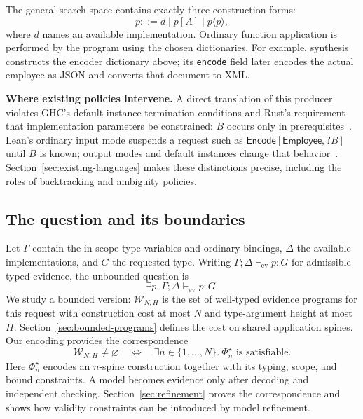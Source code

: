 \documentclass[10pt,a4paper]{article}
\newcommand{\iarg}[1]{\langle#1\rangle}
\newcommand{\kw}[1]{\mathsf{#1}}
\begin{document}
The general search space contains exactly three construction forms:
\[
 p::=d\mid p[A]\mid p\iarg{p},
\]
where $d$ names an available implementation. Ordinary function application is
performed by the program using the chosen dictionaries. For example, synthesis
constructs the encoder dictionary above; its \texttt{encode} field later encodes
the actual employee as JSON and converts that document to XML.

\textbf{Where existing policies intervene.}
A direct translation of this producer violates GHC's default instance-termination
conditions and Rust's requirement that implementation parameters be constrained:
$B$ occurs only in prerequisites~\cite{ghc-termination,rust-impl}.
Lean's ordinary input mode suspends a request such as
$\kw{Encode}[\kw{Employee},?B]$ until $B$ is known; output modes and default instances
change that behavior~\cite{lean-synthesis}.
Section~\ref{sec:existing-languages} makes these distinctions precise, including
the roles of backtracking and ambiguity policies.

\newpage
\subsection{The question and its boundaries}
Let $\Gamma$ contain the in-scope type variables and ordinary bindings,
$\Delta$ the available implementations, and $G$ the requested type.
Writing $\Gamma;\Delta\vdash_{\mathrm{ev}}p:G$ for admissible typed evidence,
the unbounded question is
\[
 \exists p.\ \Gamma;\Delta\vdash_{\mathrm{ev}}p:G.
\]
We study a bounded version: $\mathcal W_{N,H}$ is the set of well-typed evidence
programs for this request with construction cost at most $N$ and type-argument
height at most $H$. Section~\ref{sec:bounded-programs} defines the cost on shared
application spines. Our encoding provides the correspondence
\[
 \boxed{\mathcal W_{N,H}\ne\varnothing
 \quad\Longleftrightarrow\quad
 \exists n\in\{1,\ldots,N\}.\ \Phi_n^\star\text{ is satisfiable}.}
\]
Here $\Phi_n^\star$ encodes an $n$-spine construction together with its typing,
scope, and bound constraints. A model becomes evidence only after decoding and
independent checking. Section~\ref{sec:refinement} proves the correspondence and
shows how validity constraints can be introduced by model refinement.
\end{document}
